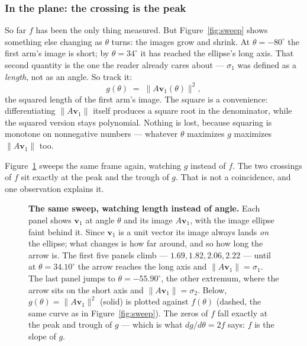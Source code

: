 \documentclass[11pt]{article}
\numberwithin{equation}{section}
\newcommand{\vv}[1]{\mathbf{v}_{#1}}
\theoremstyle{plainish}
\begin{document}
\subsubsection*{In the plane: the crossing is the peak}

So far $f$ has been the only thing measured. But Figure~\ref{fig:sweep} shows
something else changing as $\theta$ turns: the images grow and shrink. At
$\theta = -80^\circ$ the first arm's image is short; by $\theta = 34^\circ$ it
has reached the ellipse's long axis. That second quantity is the one the reader
already cares about --- $\sigma_1$ was defined as a \emph{length}, not as an
angle. So track it:
\begin{equation}g(\theta) \;=\; \|A\vv1(\theta)\|^2 ,
\end{equation}
the squared length of the first arm's image. The square is a convenience:
differentiating $\|A\vv1\|$ itself produces a square root in the denominator,
while the squared version stays polynomial. Nothing is lost, because squaring is
monotone on nonnegative numbers --- whatever $\theta$ maximizes $g$ maximizes
$\|A\vv1\|$ too.

Figure~\ref{fig:stretch} sweeps the same frame again, watching $g$ instead of
$f$. The two crossings of $f$ sit exactly at the peak and the trough of $g$.
That is not a coincidence, and one observation explains it.

\begin{figure}[htbp]
\centering

\vspace{0.9em}


\caption{\textbf{The same sweep, watching length instead of angle.} Each panel
shows $\vv1$ at angle $\theta$ and its image $A\vv1$, with the image ellipse
faint behind it. Since $\vv1$ is a unit vector its image always lands
\emph{on} the ellipse; what changes is how far around, and so how long the arrow
is. The first five panels climb --- $1.69, 1.82, 2.06, 2.22$ --- until at
$\theta = 34.10^\circ$ the arrow reaches the long axis and $\|A\vv1\| = \sigma_1$.
The last panel jumps to $\theta = -55.90^\circ$, the other extremum, where the
arrow sits on the short axis and $\|A\vv1\| = \sigma_2$. Below,
$g(\theta) = \|A\vv1\|^2$ (solid) is plotted against $f(\theta)$ (dashed, the
same curve as in Figure~\ref{fig:sweep}). The zeros of $f$ fall exactly at the
peak and trough of $g$ --- which is what $dg/d\theta = 2f$ says: $f$ is the
slope of $g$.}
\label{fig:stretch}
\end{figure}
\end{document}
